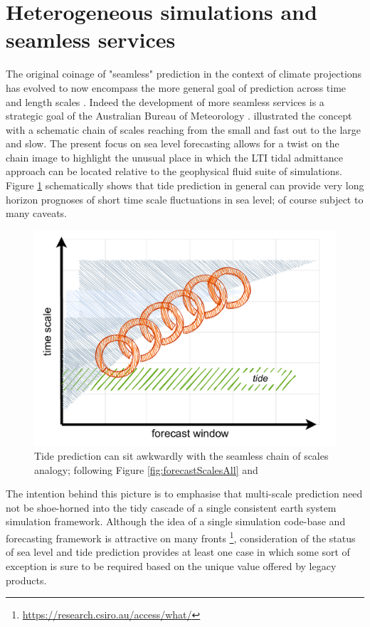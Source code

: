 \section{Heterogeneous simulations and seamless services}
The original coinage of "seamless" prediction in the context of climate projections has evolved to now encompass the more general goal of prediction across time and length scales \citep{10.1127/metz/2020/1048}.
Indeed the development of more seamless services is a strategic goal of the Australian Bureau of Meteorology \cite{BOM2020}.
\cite{10.1175/bams-89-4-459} illustrated the concept with a schematic chain of scales reaching from the small and fast out to the large and slow.
The present focus on sea level forecasting allows for a twist on the chain image to highlight the unusual place in which the LTI tidal admittance approach can be located relative to the geophysical fluid suite of simulations.
Figure \ref{fig:forecastScalesChain} schematically shows that tide prediction in general can provide very long horizon prognoses of short time scale fluctuations in sea level; of course subject to many caveats.
\begin{figure}[H]\centering
        \includegraphics[width=\figwidthFull]{figures/diagrams/scales_with_chain.pdf} 
        \caption{Tide prediction can sit awkwardly with the seamless chain of scales analogy; following Figure \ref{fig:forecastScalesAll} and \citep{10.1175/bams-89-4-459}}
        \label{fig:forecastScalesChain}
\end{figure}
The intention behind this picture is to emphasise that multi-scale prediction need not be shoe-horned into the tidy cascade of a single consistent earth system simulation framework.
Although the idea of a single simulation code-base and forecasting framework is attractive on many fronts  \footnote{\url{https://research.csiro.au/access/what/}}, consideration of the status of sea level and tide prediction provides at least one case in which some sort of exception is sure to be required based on the unique value offered by legacy products.  

